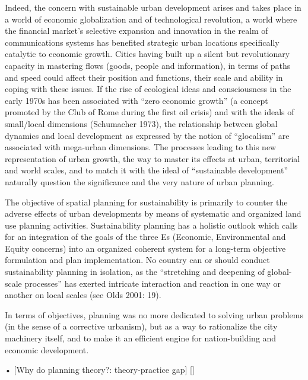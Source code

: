 Indeed, the concern with sustainable urban development arises and takes place in a world of economic globalization and of technological revolution, a world where the financial market’s selective expansion and innovation in the realm of communications systems has benefited strategic urban locations specifically catalytic to economic growth. Cities having built up a silent but revolutionary capacity in mastering flows (goods, people and information), in terms of paths and speed could affect their position and functions, their scale and ability in coping with these issues. If the rise of ecological ideas and consciousness in the early 1970s has been associated with “zero economic growth” (a concept promoted by the Club of Rome during the first oil crisis) and with the ideals of small/local dimensions (Schumacher 1973), the relationship between global dynamics and local development as expressed by the notion of “glocalism” are associated with mega-urban dimensions. The processes leading to this new representation of urban growth, the way to master its effects at urban, territorial and world scales, and to match it with the ideal of “sustainable development” naturally question the significance and the very nature of urban planning.\par

The objective of spatial planning for sustainability is primarily to counter the adverse effects of urban developments by means of systematic and organized land use planning activities. Sustainability planning has a holistic outlook which calls for an integration of the goals of the three Es (Economic, Environmental and Equity concerns) into an organized coherent system for a long-term objective formulation and plan implementation. No country can or should conduct sustainability planning in isolation, as the “stretching and deepening of global-scale processes” has exerted intricate interaction and reaction in one way or another on local scales (see Olds 2001: 19).\par



In terms of objectives, planning was no more dedicated to solving urban problems (in the sense of a corrective urbanism), but as a way to rationalize the city machinery itself, and to make it an efficient engine for nation-building and economic development.  




•	[Why do planning theory?: theory-practice gap]
[\parencite{Yiftachel1989}] \par
[\parencite{Alexander2003}] \par
[\parencite{Alexander1997}] \par
[\parencite{Friedmann2003}] \par





